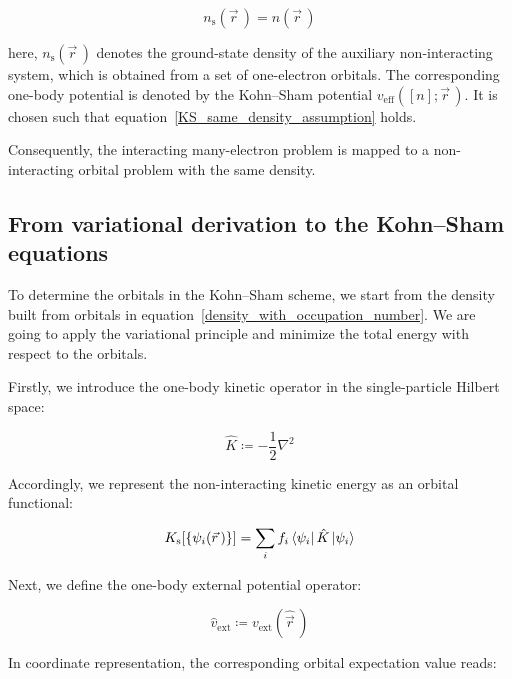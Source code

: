 \begin{equation}
    n_\mathrm{s}(\vec{r}\,)=n(\vec{r}\,)
\label{KS_same_density_assumption}
\end{equation}

here, $n_\mathrm{s}(\vec{r}\,)$ denotes the ground-state density of the auxiliary non-interacting system,
which is obtained from a set of one-electron orbitals.
The corresponding one-body potential is denoted by the Kohn--Sham potential $v_\mathrm{eff}([n];\vec{r}\,)$.
It is chosen such that equation~\eqref{KS_same_density_assumption} holds.

Consequently, the interacting many-electron problem is mapped to a non-interacting orbital problem with the same density.

\FloatBarrier
\subsection{From variational derivation to the Kohn--Sham equations}
\label{subsec:KS_variational_derivation}

To determine the orbitals in the Kohn--Sham scheme,
we start from the density built from orbitals in equation~\eqref{density_with_occupation_number}.
We are going to apply the variational principle and minimize the total energy with respect to the orbitals.

Firstly, we introduce the one-body kinetic operator in the single-particle Hilbert space:

\begin{equation}
    \hat{K}\coloneqq
    -\frac{1}{2}\nabla^2
\label{KS_one_body_kinetic_operator_definition}
\end{equation}

Accordingly, we represent the non-interacting kinetic energy as an orbital functional:

\begin{equation}
    K_\mathrm{s}[\{\psi_i(\vec{r}\,)\}]=
    \sum_i f_i \bra{\psi_i}\hat{K}\ket{\psi_i}
\label{KS_noninteracting_kinetic_energy_orbital_functional}
\end{equation}

Next, we define the one-body external potential operator:

\begin{equation}
    \hat{v}_\mathrm{ext}\coloneqq
    v_\mathrm{ext}(\hat{\vec{r}}\,)
\label{KS_one_body_external_operator_definition}
\end{equation}

In coordinate representation, the corresponding orbital expectation value reads:

